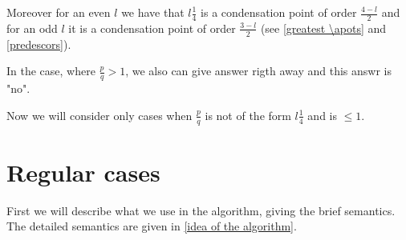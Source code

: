 Moreover for an even $l$ we have that $l\frac{1}{4}$ is a condensation point of order 
$\frac{4-l}{2}$ 
and for an odd $l$ it is a condensation point of order $\frac{3-l}{2}$ (see \ref{greatest \apots} 
and \ref{predescors}). 

In the case, where $\frac{p}{q} > 1$, we also can give answer rigth away and this answr is "no". 

Now we will consider only cases when $\frac{p}{q}$ is not of the form $l\frac{1}{4}$ and is 
$\leq 1$.
%
%
%
%
%
%
\section{Regular cases}
First we will describe what we use in the algorithm, giving the brief semantics. 
The detailed semantics are given in \ref{idea of the algorithm}.

